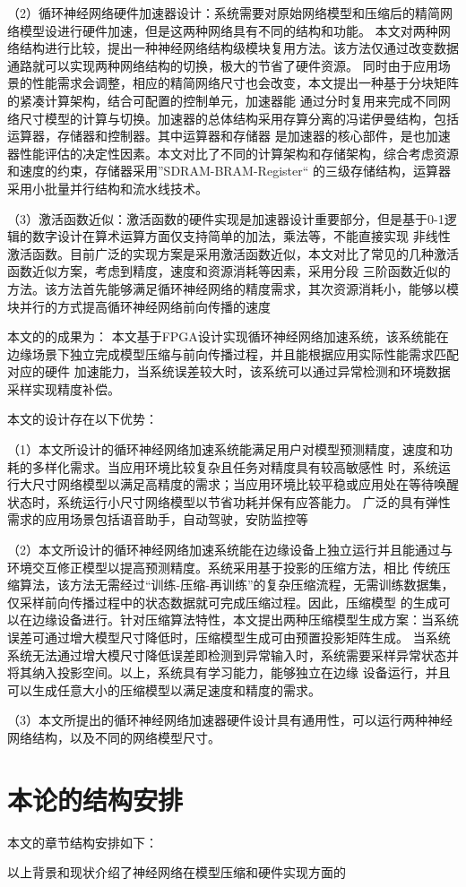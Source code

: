 （2）循环神经网络硬件加速器设计：系统需要对原始网络模型和压缩后的精简网络模型设进行硬件加速，但是这两种网络具有不同的结构和功能。
本文对两种网络结构进行比较，提出一种神经网络结构级模块复用方法。该方法仅通过改变数据通路就可以实现两种网络结构的切换，极大的节省了硬件资源。
同时由于应用场景的性能需求会调整，相应的精简网络尺寸也会改变，本文提出一种基于分块矩阵的紧凑计算架构，结合可配置的控制单元，加速器能
通过分时复用来完成不同网络尺寸模型的计算与切换。加速器的总体结构采用存算分离的冯诺伊曼结构，包括运算器，存储器和控制器。其中运算器和存储器
是加速器的核心部件，是也加速器性能评估的决定性因素。本文对比了不同的计算架构和存储架构，综合考虑资源和速度的约束，存储器采用”SDRAM-BRAM-Register“
的三级存储结构，运算器采用小批量并行结构和流水线技术。

（3）激活函数近似：激活函数的硬件实现是加速器设计重要部分，但是基于0-1逻辑的数字设计在算术运算方面仅支持简单的加法，乘法等，不能直接实现
非线性激活函数。目前广泛的实现方案是采用激活函数近似，本文对比了常见的几种激活函数近似方案，考虑到精度，速度和资源消耗等因素，采用分段
三阶函数近似的方法。该方法首先能够满足循环神经网络的精度需求，其次资源消耗小，能够以模块并行的方式提高循环神经网络前向传播的速度

本文的的成果为： 本文基于FPGA设计实现循环神经网络加速系统，该系统能在边缘场景下独立完成模型压缩与前向传播过程，并且能根据应用实际性能需求匹配对应的硬件
加速能力，当系统误差较大时，该系统可以通过异常检测和环境数据采样实现精度补偿。

本文的设计存在以下优势：

（1）本文所设计的循环神经网络加速系统能满足用户对模型预测精度，速度和功耗的多样化需求。当应用环境比较复杂且任务对精度具有较高敏感性
时，系统运行大尺寸网络模型以满足高精度的需求；当应用环境比较平稳或应用处在等待唤醒状态时，系统运行小尺寸网络模型以节省功耗并保有应答能力。
广泛的具有弹性需求的应用场景包括语音助手，自动驾驶，安防监控等　

（2）本文所设计的循环神经网络加速系统能在边缘设备上独立运行并且能通过与环境交互修正模型以提高预测精度。系统采用基于投影的压缩方法，相比
传统压缩算法，该方法无需经过“训练-压缩-再训练”的复杂压缩流程，无需训练数据集，仅采样前向传播过程中的状态数据就可完成压缩过程。因此，压缩模型
的生成可以在边缘设备进行。针对压缩算法特性，本文提出两种压缩模型生成方案：当系统误差可通过增大模型尺寸降低时，压缩模型生成可由预置投影矩阵生成。
当系统系统无法通过增大模尺寸降低误差即检测到异常输入时，系统需要采样异常状态并将其纳入投影空间。以上，系统具有学习能力，能够独立在边缘
设备运行，并且可以生成任意大小的压缩模型以满足速度和精度的需求。

（3）本文所提出的循环神经网络加速器硬件设计具有通用性，可以运行两种神经网络结构，以及不同的网络模型尺寸。

\section{本论的结构安排}
本文的章节结构安排如下：

以上背景和现状介绍了神经网络在模型压缩和硬件实现方面的 
